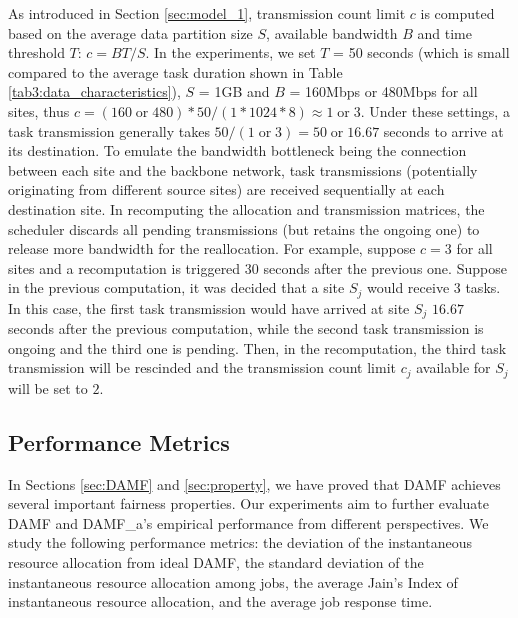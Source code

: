 As introduced in Section \ref{sec:model_1}, transmission count limit $c$ is computed based on the average data partition size $S$, available bandwidth $B$ and time threshold $T$: $c = BT/S$. In the experiments, we set $T$ = 50 seconds (which is small compared to the average task duration shown in Table \ref{tab3:data_characteristics}), $S$ = 1GB and $B$ = 160Mbps or 480Mbps for all sites, thus $c = (160\; \text{or}\;480)*50/(1*1024*8) \approx 1\; \text{or}\; 3$. Under these settings, a task transmission generally takes $50/ (1\;\text{or}\;3)=50\;\text{or}\;16.67$ seconds to arrive at its destination. To emulate the bandwidth bottleneck being the connection between each site and the backbone network, task transmissions (potentially originating from different source sites) are received sequentially at each destination site. In recomputing the allocation and transmission matrices, the scheduler discards all pending transmissions (but retains the ongoing one) to release more bandwidth for the reallocation. For example, suppose $c=3$ for all sites and a recomputation is triggered $30$ seconds after the previous one. Suppose in the previous computation, it was decided that a site $S_j$ would receive $3$ tasks. In this case, the first task transmission would have arrived at site $S_j$ $16.67$ seconds after the previous computation, while the second task transmission is ongoing and the third one is pending. Then, in the recomputation, the third task transmission will be rescinded and the transmission count limit $c_j$ available for $S_j$ will be set to $2$.

\subsection{Performance Metrics}
In Sections \ref{sec:DAMF} and \ref{sec:property}, we have proved that DAMF achieves several important fairness properties. Our experiments aim to further evaluate DAMF and DAMF\_a's empirical performance from different perspectives. We study the following  performance metrics: the deviation of the instantaneous resource allocation from ideal DAMF, the standard deviation of the instantaneous resource allocation among jobs, the average Jain's Index of instantaneous resource allocation, and the average job response time. 

